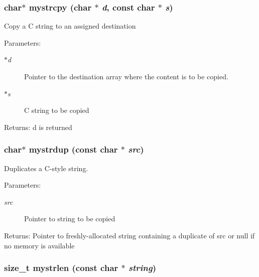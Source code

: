 \subsubsection{\setlength{\rightskip}{0pt plus 5cm}char$\ast$ mystrcpy (char $\ast$ {\em d}, const char $\ast$ {\em s})}\label{mystring_8c_73d1b6d63115637abb80ccb5d32bec31}


Copy a C string to an assigned destination \begin{Desc}
\item[Parameters:]
\begin{description}
\item[{\em $\ast$d}]Pointer to the destination array where the content is to be copied. \item[{\em $\ast$s}]C string to be copied \end{description}
\end{Desc}
\begin{Desc}
\item[Returns:]d is returned \end{Desc}
\subsubsection{\setlength{\rightskip}{0pt plus 5cm}char$\ast$ mystrdup (const char $\ast$ {\em src})}\label{mystring_8c_148a52c665d88f52fb4995338a319d3c}


Duplicates a C-style string. \begin{Desc}
\item[Parameters:]
\begin{description}
\item[{\em src}]Pointer to string to be copied \end{description}
\end{Desc}
\begin{Desc}
\item[Returns:]Pointer to freshly-allocated string containing a duplicate of src or null if no memory is available \end{Desc}
\subsubsection{\setlength{\rightskip}{0pt plus 5cm}size\_\-t mystrlen (const char $\ast$ {\em string})}\label{mystring_8c_024ec4fe2e0814f14c6e17b2c79f91e3}


